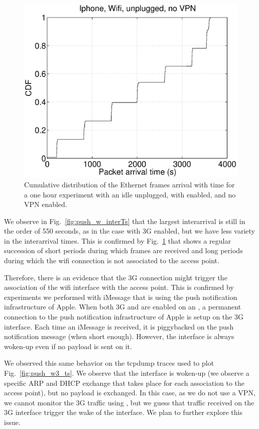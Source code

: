 \begin{figure}
\centering
        \includegraphics[width=0.8\linewidth]{../../code/pushNotification/Fig/bw_iphone_wifi_unplug_novpn_ts.eps}
  \caption{Cumulative distribution of the Ethernet frames
          arrival with time for a one hour experiment with an idle
          \iphone{} unplugged, with \wifi{} enabled, and no VPN
          enabled.}
  \label{fig:push_w_ts}
\end{figure}

We observe in Fig.~\ref{fig:push_w_interTs} that the largest
interarrival is still in the order of 550 seconds, as in the case with
3G enabled, but we have less variety in the interarrival times. This
is confirmed by Fig.~\ref{fig:push_w_ts} that shows a regular
succession of short periods during which frames are received and long
periods during which the wifi connection is not associated to the
access point.

Therefore, there is an evidence that the 3G connection might trigger
the association of the \iphone{} wifi interface with the access
point. This is confirmed by experiments we performed with iMessage
that is using the push notification infrastructure of Apple. When both
3G and \wifi{} are enabled on an \iphone{}, a permanent connection to
the push notification infrastructure of Apple is setup on the 3G
interface. Each time an iMessage is received, it is piggybacked on the
push notification message (when short enough). However, the \wifi{}
interface is always woken-up even if no payload is sent on it. 

We observed this same behavior on the tcpdump traces used to plot
Fig.~\ref{fig:push_w3_ts}. We observe that the \wifi{} interface is
woken-up (we observe a specific ARP and DHCP exchange that takes place
for each \wifi{} association to the access point), but no payload is
exchanged. In this case, as we do not use a VPN, we cannot monitor the
3G traffic using \meddle{}, but we guess that traffic received on the
3G interface trigger the wake of the \wifi{} interface. We plan to
further explore this issue. 


